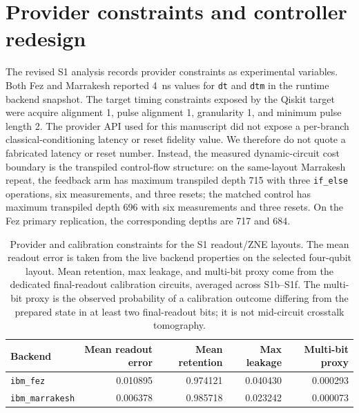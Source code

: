 \documentclass[preprint,aps,physrev,superscriptaddress,floatfix,longbibliography]{revtex4-2}
\begin{document}
\section{Provider constraints and controller redesign}

The revised S1 analysis records provider constraints as experimental
variables. Both Fez and Marrakesh reported \SI{4}{\nano\second} values for
\texttt{dt} and \texttt{dtm} in the runtime backend snapshot. The target
timing constraints exposed by the Qiskit target were acquire alignment 1,
pulse alignment 1, granularity 1, and minimum pulse length 2. The provider API
used for this manuscript did not expose a per-branch classical-conditioning
latency or reset fidelity value. We therefore do not quote a fabricated
latency or reset number. Instead, the measured dynamic-circuit cost boundary
is the transpiled control-flow structure: on the same-layout Marrakesh repeat,
the feedback arm has maximum transpiled depth 715 with three
\texttt{if\_else} operations, six measurements, and three resets; the matched
control has maximum transpiled depth 696 with six measurements and three
resets. On the Fez primary replication, the corresponding depths are 717 and
684.

\begin{table}[tb]
\centering
\scriptsize
\begin{tabular}{lrrrr}
\toprule
Backend & Mean readout error & Mean retention & Max leakage & Multi-bit proxy \\
\midrule
\texttt{ibm\_fez} & 0.010895 & 0.974121 & 0.040430 & 0.000293 \\
\texttt{ibm\_marrakesh} & 0.006378 & 0.985718 & 0.023242 & 0.000073 \\
\bottomrule
\end{tabular}
\caption{Provider and calibration constraints for the S1 readout/ZNE layouts.
The mean readout error is taken from the live backend properties on the
selected four-qubit layout. Mean retention, max leakage, and multi-bit proxy
come from the dedicated final-readout calibration circuits, averaged across
S1b--S1f. The multi-bit proxy is the observed probability of a calibration
outcome differing from the prepared state in at least two final-readout bits;
it is not mid-circuit crosstalk tomography.}
\label{tab:provider-constraints}
\end{table}
\end{document}
